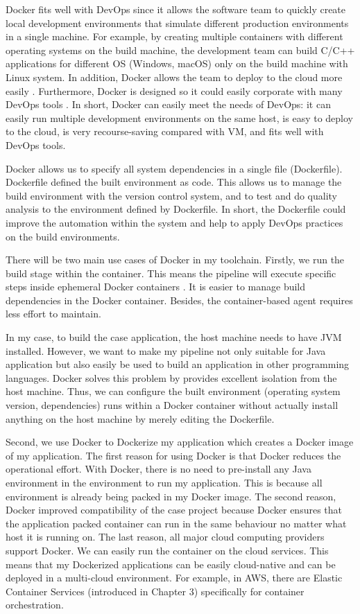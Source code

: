 Docker fits well with DevOps since it allows the software team to quickly create local development environments that simulate different production environments in a single machine. For example, by creating multiple containers with different operating systems on the build machine, the development team can build C/C++ applications for different OS (Windows, macOS) only on the build machine with Linux system.
In addition, Docker allows the team to deploy to the cloud more easily \cite{vaughan2014docker}. Furthermore, Docker is designed so it could easily corporate with many DevOps tools \cite{Whosusin96:online}. In short, Docker can easily meet the needs of DevOps: it can easily run multiple development environments on the same host, is easy to deploy to the cloud, is very recourse-saving compared with VM, and fits well with DevOps tools.
\par
Docker allows us to specify all system dependencies in a single file (Dockerfile). Dockerfile defined the built environment as code. This allows us to manage the build environment with the version control system, and to test and do quality analysis to the environment defined by Dockerfile. In short, the Dockerfile could improve the automation within the system and help to apply DevOps practices on the build environments.
\par
\label{docker}
There will be two main use cases of Docker in my toolchain. Firstly, we run the build stage within the container.
This means the pipeline will execute specific steps inside ephemeral Docker containers \cite{Overview44:online}. It is easier to manage build dependencies in the Docker container. Besides, the container-based agent requires less effort to maintain.
\par
In my case, to build the case application, the host machine needs to have JVM installed. However, we want to make my pipeline not only suitable for Java application but also easily be used to build an application in other programming languages. Docker solves this problem by provides excellent isolation from the host machine. Thus, we can configure the built environment (operating system version, dependencies) runs within a Docker container without actually install anything on the host machine by merely editing the Dockerfile.
\par
Second, we use Docker to Dockerize my application which creates a Docker image of my application. The first reason for using Docker is that Docker reduces the operational effort.
With Docker, there is no need to pre-install any Java environment in the environment to run my application. This is because all environment is already being packed in my Docker image. 
The second reason, Docker improved compatibility of the case project because Docker ensures that the application packed container can run in the same behaviour no matter what host it is running on.
The last reason, all major cloud computing providers support Docker. 
We can easily run the container on the cloud services. This means that my Dockerized applications can be easily cloud-native and can be deployed in a multi-cloud environment. For example, in AWS, there are Elastic Container Services (introduced in Chapter 3) specifically for container orchestration.
